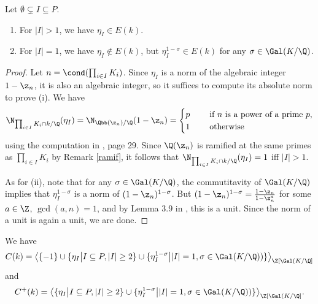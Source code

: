 \begin{lemma}\leavevmode \label{units}
Let  $\emptyset \subsetneq I \subseteq P$.
\begin{enumerate} [label={\upshape(\roman*)}]
\item For $|I|>1$, we have $\eta_I\in E(k)$.
\item For $|I|=1$, we have $\eta_I\not\in E(k)$, but $\eta_I^{1-\sigma}\in E(k)$ for any $\sigma\in \Gal(K/\Q)$. %
\end{enumerate}
\end{lemma}
\begin{proof}
Let $n=\cond(\prod_{i\in I}K_i)$. Since $\eta_I$ is a norm of the algebraic integer $1-\z_n$, it is also an algebraic integer, so it suffices to compute its absolute norm to prove (i).
We have 
\begin{align*}
\N_{\prod_{i\in I}K_i\cap k/\Q}(\eta_I)=\N_{\Qbb(\z_n)/\Q}(1-\z_n)=
\begin{cases}
p & \quad \text{ if } n \text{ is a power of a prime } p,\\
1 & \quad \text{ otherwise } \\
\end{cases}
\end{align*}
using the computation in \citep{Sedlacek2015thesis}, page 29. Since $\Q(\z_n)$ is ramified at the same primes as $\prod_{i\in I}K_i$ by Remark \ref{ramif}, it follows that $\N_{\prod_{i\in I}K_i\cap k/\Q}(\eta_I)=1$ iff $|I|>1$.

As for (ii), note that for any $\sigma\in \Gal(K/\Q)$, the commutitavity of $\Gal(K/\Q)$ implies that $\eta_I^{1-\sigma}$ is a norm of $(1-\z_n)^{1-\sigma}$. But $(1-\z_n)^{1-\sigma}=\frac{1-\z_n}{1-\z_n^a}$ for some $a\in\Z$, $\gcd(a,n)=1$, and by Lemma 3.9 in \citep{Sedlacek2015thesis}, this is a unit. Since the norm of a unit is again a unit, we are done.
\end{proof}

\begin{cor}
We have $$C(k)=\big\langle \{ -1\}\cup \{\eta_I \big\vert I \subseteq P,  |I|\geq 2\} \cup \{\eta_I^{1-\sigma} \big\vert |I|=1, \sigma\in \Gal(K/\Q))\}\big\rangle_{\Z[\Gal(K/\Q]}$$
and
$$C^+(k)=\big\langle \{ \eta_I \big\vert I \subseteq P,  |I|\geq 2\} \cup \{\eta_I^{1-\sigma} \big\vert |I|=1, \sigma\in \Gal(K/\Q))\}\big\rangle_{\Z[\Gal(K/\Q]}.$$
\end{cor}

